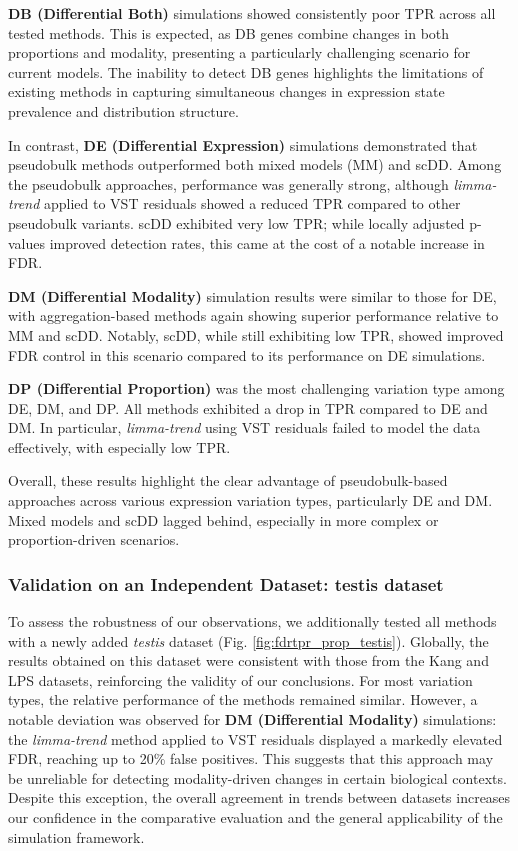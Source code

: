 \documentclass[a4paper, 11pt, twocolumn]{article}
\begin{document}
\begin{multicols}{2}
\textbf{DB (Differential Both)} simulations showed consistently poor TPR across all tested methods. This is expected, as DB genes combine changes in both proportions and modality, presenting a particularly challenging scenario for current models. The inability to detect DB genes highlights the limitations of existing methods in capturing simultaneous changes in expression state prevalence and distribution structure.

In contrast, \textbf{DE (Differential Expression)} simulations demonstrated that pseudobulk methods outperformed both mixed models (MM) and scDD. Among the pseudobulk approaches, performance was generally strong, although \textit{limma-trend} applied to VST residuals showed a reduced TPR compared to other pseudobulk variants. scDD exhibited very low TPR; while locally adjusted p-values improved detection rates, this came at the cost of a notable increase in FDR.

\textbf{DM (Differential Modality)} simulation results were similar to those for DE, with aggregation-based methods again showing superior performance relative to MM and scDD. Notably, scDD, while still exhibiting low TPR, showed improved FDR control in this scenario compared to its performance on DE simulations.

\textbf{DP (Differential Proportion)} was the most challenging variation type among DE, DM, and DP. All methods exhibited a drop in TPR compared to DE and DM. In particular, \textit{limma-trend} using VST residuals failed to model the data effectively, with especially low TPR.

Overall, these results highlight the clear advantage of pseudobulk-based approaches across various expression variation types, particularly DE and DM. Mixed models and scDD lagged behind, especially in more complex or proportion-driven scenarios.
\subsubsection{Validation on an Independent Dataset: testis dataset} 
To assess the robustness of our observations, we additionally tested all methods with a newly added \textit{testis} dataset (Fig. \ref{fig:fdrtpr_prop_testis}). Globally, the results obtained on this dataset were consistent with those from the Kang and LPS datasets, reinforcing the validity of our conclusions. For most variation types, the relative performance of the methods remained similar. However, a notable deviation was observed for \textbf{DM (Differential Modality)} simulations: the \textit{limma-trend} method applied to VST residuals displayed a markedly elevated FDR, reaching up to 20\% false positives. This suggests that this approach may be unreliable for detecting modality-driven changes in certain biological contexts. Despite this exception, the overall agreement in trends between datasets increases our confidence in the comparative evaluation and the general applicability of the simulation framework.


\end{multicols}
\end{document}
